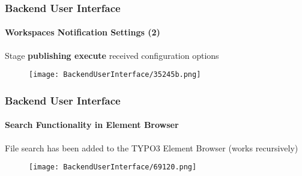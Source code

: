 \begin{frame}[fragile]
	\frametitle{Backend User Interface}
	\framesubtitle{Workspaces Notification Settings (2)}

	Stage \textbf{publishing execute} received configuration options

	\begin{figure}
		\texttt{[image: BackendUserInterface/35245b.png]}
	\end{figure}

\end{frame}

\begin{frame}[fragile]
	\frametitle{Backend User Interface}
	\framesubtitle{Search Functionality in Element Browser}

	File search has been added to the TYPO3 Element Browser (works recursively)

	\begin{figure}
		\texttt{[image: BackendUserInterface/69120.png]}
	\end{figure}

\end{frame}

